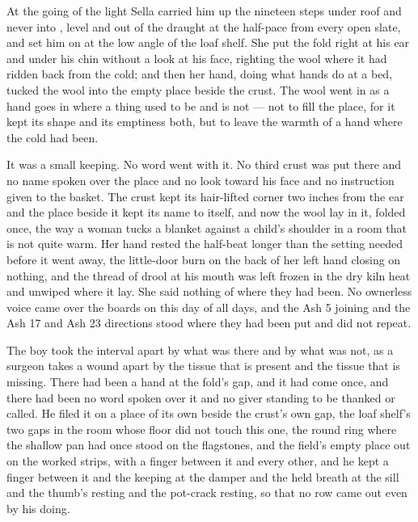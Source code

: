 \scenebreak

At the going of the light Sella carried him up the nineteen steps under  roof and never into , level and out of the draught at the half-pace from every open slate, and set him on  at the low angle of the loaf shelf. She put the fold right at his ear and under his chin without a look at his face, righting the wool where it had ridden back from the cold; and then her hand, doing what hands do at a bed, tucked the wool into the empty place beside the crust. The wool went in as a hand goes in where a thing used to be and is not — not to fill the place, for it kept its shape and its emptiness both, but to leave the warmth of a hand where the cold had been.

It was a small keeping. No word went with it. No third crust was put there and no name spoken over the place and no look toward his face and no instruction given to the basket. The crust kept its hair-lifted corner two inches from the ear and the place beside it kept its name to itself, and now the wool lay in it, folded once, the way a woman tucks a blanket against a child's shoulder in a room that is not quite warm. Her hand rested the half-beat longer than the setting needed before it went away, the little-door burn on the back of her left hand closing on nothing, and the thread of drool at his mouth was left frozen in the dry kiln heat and unwiped where it lay. She said nothing of where they had been. No ownerless voice came over the boards on this day of all days, and the Ash 5 joining and the Ash 17 and Ash 23 directions stood where they had been put and did not repeat.

\scenebreak

The boy took the interval apart by what was there and by what was not, as a surgeon takes a wound apart by the tissue that is present and the tissue that is missing. There had been a hand at the fold's gap, and it had come once, and there had been no word spoken over it and no giver standing to be thanked or called. He filed it on a place of its own beside the crust's own gap, the loaf shelf's two gaps in the room whose floor did not touch this one, the round ring where the shallow pan had once stood on the flagstones, and the field's empty place out on the worked strips, with a finger between it and every other, and he kept a finger between it and the keeping at the damper and the held breath at the sill and the thumb's resting and the pot-crack resting, so that no row came out even by his doing.

